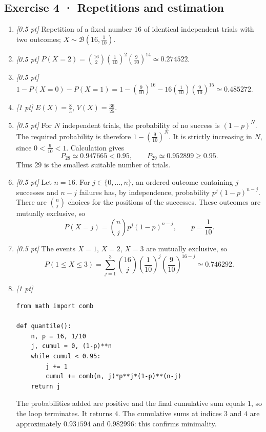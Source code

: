 \subsection*{Exercise 4 · Repetitions and estimation}\begin{enumerate}

\item \textit{[0.5 pt]} Repetition of a fixed number $16$ of identical independent trials with two outcomes; $X\sim\mathcal B(16,\frac{1}{10})$.

\item \textit{[0.5 pt]} $P(X=2)=\binom{16}2(\frac{1}{10})^2(\frac{9}{10})^{14}\simeq0.274522$.

\item \textit{[0.5 pt]} $1-P(X=0)-P(X=1)=1-(\frac{9}{10})^{16}-16(\frac{1}{10})(\frac{9}{10})^{15}\simeq0.485272$.

\item \textit{[1 pt]} $E(X)=\frac{8}{5}$, $V(X)=\frac{36}{25}$.

\item \textit{[0.5 pt]} For $N$ independent trials, the probability of no success is $(1-p)^N$. The required probability is therefore $1-(\frac{9}{10})^N$. It is strictly increasing in $N$, since $0<\frac{9}{10}<1$. Calculation gives
\[P_{28}\simeq0.947665<0.95,\qquad P_{29}\simeq0.952899\ge0.95.\]
Thus $29$ is the smallest suitable number of trials.

\item \textit{[0.5 pt]} Let $n=16$. For $j\in\{0,\ldots,n\}$, an ordered outcome containing $j$ successes and $n-j$ failures has, by independence, probability $p^j(1-p)^{n-j}$. There are $\binom nj$ choices for the positions of the successes. These outcomes are mutually exclusive, so
\[P(X=j)=\binom nj p^j(1-p)^{n-j},\qquad p=\frac{1}{10}.\]

\item \textit{[0.5 pt]} The events $X=1$, $X=2$, $X=3$ are mutually exclusive, so
\[P(1\le X\le3)=\sum_{j=1}^3\binom{16}j(\frac{1}{10})^j(\frac{9}{10})^{16-j}\simeq0.746292.\]


\item \textit{[1 pt]} 
\begin{lstlisting}
from math import comb

def quantile():
    n, p = 16, 1/10
    j, cumul = 0, (1-p)**n
    while cumul < 0.95:
        j += 1
        cumul += comb(n, j)*p**j*(1-p)**(n-j)
    return j
\end{lstlisting}
The probabilities added are positive and the final cumulative sum equals $1$, so the loop terminates. It returns $4$. The cumulative sums at indices $3$ and $4$ are approximately $0.931594$ and $0.982996$: this confirms minimality.

\end{enumerate}


